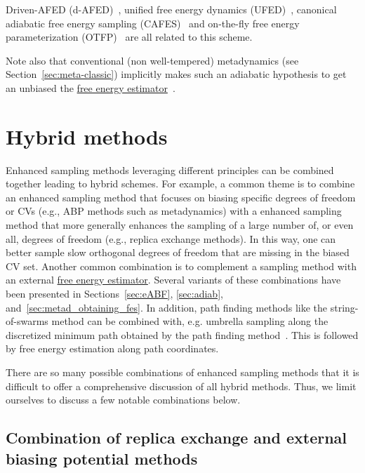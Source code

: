 \documentclass[9pt,review]{livecoms}
\begin{document}
Driven-AFED (d-AFED)~\cite{doi:10.1021/jp805039u}, unified free energy dynamics (UFED)~\cite{doi:10.1063/1.4733389}, canonical adiabatic free energy sampling (CAFES)~\cite{doi:10.1021/jp013346k} and on-the-fly free energy parameterization (OTFP)~\cite{ABRAMS2012114} are all related to this scheme.

Note also that conventional (non well-tempered) metadynamics (see Section~\ref{sec:meta-classic}) implicitly makes such an adiabatic hypothesis to get an unbiased the \hyperlink{ref:FEestimator} {free energy estimator}~\cite{laio-gervasio-08, jourdain-lelievre-zitt-21}.


\section{Hybrid methods}
\label{sec:hybrids}

Enhanced sampling methods leveraging different principles can be combined together leading to hybrid schemes.
For example, a common theme is to combine an enhanced sampling method that focuses on biasing specific degrees of freedom or CVs (e.g., ABP methods such as metadynamics) with a enhanced sampling method that more generally enhances the sampling of a large number of, or even all, degrees of freedom (e.g., replica exchange methods). In this way, one can better sample slow orthogonal degrees of freedom that are missing in the biased CV set.
Another common combination is to complement a sampling method with an external \hyperlink{ref:FEestimator} {free energy estimator}. Several variants of these combinations have been presented in Sections~\ref{sec:eABF}, \ref{sec:adiab}, and~\ref{sec:metad_obtaining_fes}.
In addition, path finding methods like the string-of-swarms method can be combined with, e.g. umbrella sampling along the discretized minimum path obtained by the path finding method~\cite{doi:10.1021/jp0777059}. This is followed by free energy estimation along path coordinates.

There are so many possible combinations of enhanced sampling methods that it is difficult to offer a comprehensive discussion of all hybrid methods. Thus, we limit ourselves to discuss a few notable combinations below.


\subsection{Combination of replica exchange and external biasing potential methods}
\end{document}
